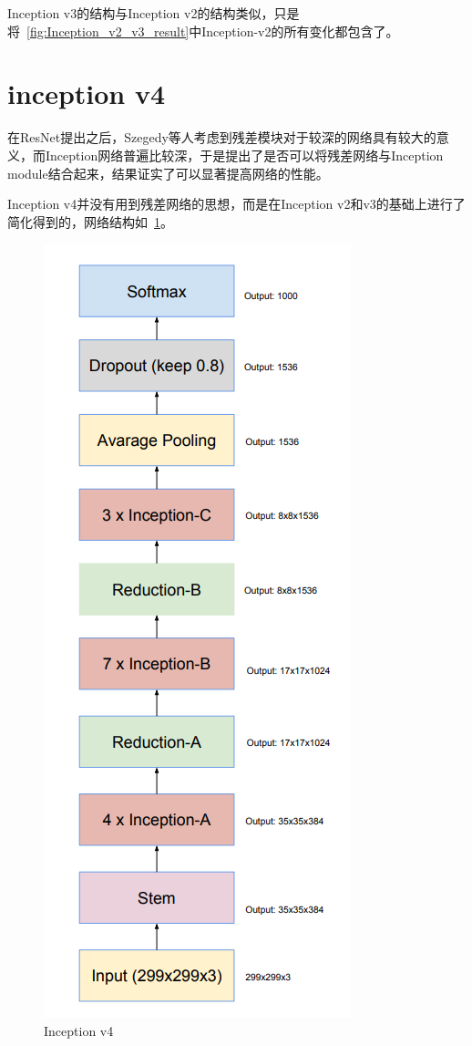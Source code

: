 Inception v3的结构与Inception v2的结构类似，只是将~\ref{fig:Inception_v2_v3_result}中Inception-v2的所有变化都包含了。

\section{inception v4}

在ResNet提出之后，Szegedy等人\cite{szegedy2017inception}考虑到残差模块对于较深的网络具有较大的意义，而Inception网络普遍比较深，于是提出了是否可以将残差网络与Inception module结合起来，结果证实了可以显著提高网络的性能。

Inception v4并没有用到残差网络的思想，而是在Inception v2和v3的基础上进行了简化得到的，网络结构如~\ref{fig:Inception_v4_model}。

\begin{figure}[htbp]
	\centering
	\includegraphics[width=0.6\linewidth]{readings_figures/Inception_v4_model.png}
	\caption{Inception v4}
	\label{fig:Inception_v4_model}
\end{figure}


